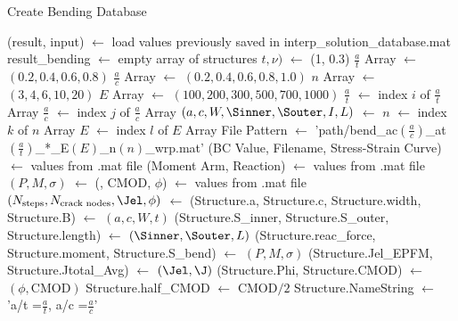 \begin{algorithm}[tbp]
  \caption{Create Bending Database}
  \label{alg:create_bending_database}
  \begin{algorithmic}
    \State (result, input) $\gets$ load values previously saved in interp\_solution\_database.mat
    \State result\_bending $\gets$ empty array of structures
    \State \(t, \nu)\) $\gets$ (1, 0.3) 
    \State \(\frac{a}{t}\) Array $\gets$ $(0.2, 0.4, 0.6, 0.8)$
    \State \(\frac{a}{c}\) Array $\gets$ $(0.2, 0.4, 0.6, 0.8, 1.0)$
    \State \(n\) Array $\gets$ $(3, 4, 6, 10, 20)$
    \State \(E\) Array $\gets$ $(100, 200, 300, 500, 700, 1000)$
        \State \(\frac{a}{t}\) $\gets$ index \(i\) of \(\frac{a}{t}\) Array
        \State \(\frac{a}{c}\) $\gets$ index \(j\) of \(\frac{a}{c}\) Array
        \State \((a, c, W, \Sinner, \Souter, I, L)\) $\gets$ 
            \State \(n\) $\gets$ index \(k\) of \(n\) Array
            \State \(E\) $\gets$ index \(l\) of \(E\) Array
            \State File Pattern $\gets$ 'path/bend\_ac\((\frac{a}{c})\)\_at\((\frac{a}{t})\)\_*\_E\((E)\)\_n\((n)\)\_wrp.mat'
            \State {}
            \State (BC Value, Filename, Stress-Strain Curve) $\gets$ values from .mat file
            \State (Moment Arm, Reaction) $\gets$ values from .mat file
            \State \((P, M, \sigma)\) $\gets$ 
            \State (\J, CMOD, \(\phi\)) $\gets$ values from .mat file
            \State {}
            \State \((N_\text{steps}, N_\text{crack nodes}, \Jel, \phi)\) $\gets$ 
            \State (Structure.a, Structure.c, Structure.width, Structure.B) $\gets$ \((a, c, W, t)\)
            \State (Structure.S\_inner, Structure.S\_outer, Structure.length) $\gets$ \((\Sinner, \Souter, L)\)
            \State (Structure.reac\_force, Structure.moment, Structure.S\_bend) $\gets$ $(P, M, \sigma)$
            \State (Structure.Jel\_EPFM, Structure.Jtotal\_Avg) $\gets$ $(\Jel, \J)$
            \State (Structure.Phi, Structure.CMOD) $\gets$ $(\phi, \text{CMOD})$
            \State Structure.half\_CMOD $\gets$ $\text{CMOD}/2$
            \State Structure.NameString $\gets$ 'a/t =\(\frac{a}{t}\), a/c =\(\frac{a}{c}\)'

\end{algorithmic}
\end{algorithm}
